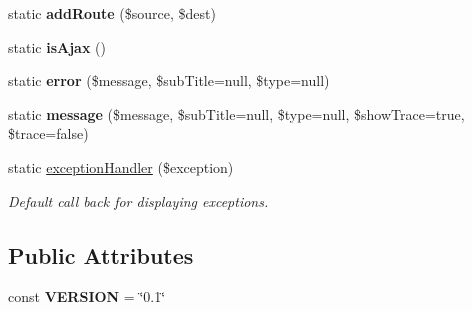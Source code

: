 \begin{DoxyCompactItemize}
\item 
\hypertarget{class_ntentan_a35b2b752a50d5cab127f09e722d6bb85}{
static {\bfseries addRoute} (\$source, \$dest)}
\label{class_ntentan_a35b2b752a50d5cab127f09e722d6bb85}

\item 
\hypertarget{class_ntentan_a63ba6c4c67e23cbd0310b844235b952f}{
static {\bfseries isAjax} ()}
\label{class_ntentan_a63ba6c4c67e23cbd0310b844235b952f}

\item 
\hypertarget{class_ntentan_aadb43e645ab935c3d9994354c104dd06}{
static {\bfseries error} (\$message, \$subTitle=null, \$type=null)}
\label{class_ntentan_aadb43e645ab935c3d9994354c104dd06}

\item 
\hypertarget{class_ntentan_a1737eab45817f0bae620a51e2bf83b4f}{
static {\bfseries message} (\$message, \$subTitle=null, \$type=null, \$showTrace=true, \$trace=false)}
\label{class_ntentan_a1737eab45817f0bae620a51e2bf83b4f}

\item 
static \hyperlink{class_ntentan_aa6c204fe10f8eff5e5da9352c8ca5b8a}{exceptionHandler} (\$exception)
\begin{DoxyCompactList}\small\item\em Default call back for displaying exceptions. \item\end{DoxyCompactList}\end{DoxyCompactItemize}
\subsection*{Public Attributes}
\begin{DoxyCompactItemize}
\item 
\hypertarget{class_ntentan_a85c9908e7aea8f5b38ab369e2cbd9ccb}{
const {\bfseries VERSION} = \char`\"{}0.1\char`\"{}}
\label{class_ntentan_a85c9908e7aea8f5b38ab369e2cbd9ccb}

\end{DoxyCompactItemize}
